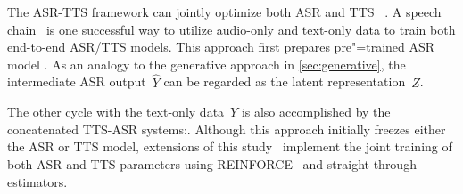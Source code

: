 The ASR-TTS framework can jointly optimize both ASR and TTS ~\parencite{tjandra_listening_2017,hori_cycleconsistency_2019,wang_improving_2020}.
A speech chain~\parencite{tjandra_listening_2017,tjandra_machine_2018} is one 
successful way to utilize audio-only and text-only data to train both
end-to-end ASR/TTS models.
This approach first prepares pre"=trained ASR model .
As an analogy to the generative approach in \cref{sec:generative}, the
intermediate ASR output~$\hat{Y}$ can be regarded as the latent representation~$Z$.

The other cycle with the text-only data~$Y$ is also accomplished by the
concatenated TTS-ASR systems:.
Although this approach initially freezes either the ASR or TTS model, 
extensions of this study~\parencite{hori_cycleconsistency_2019,tjandra_endtoend_2019,baskar_semisupervised_2019}
implement the joint training of both ASR and TTS parameters using 
REINFORCE~\parencite{williams_simple_1992} and straight-through estimators.

